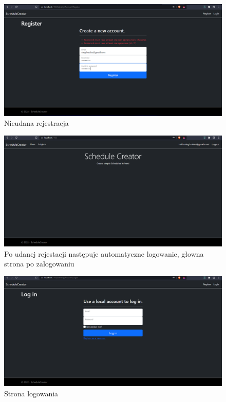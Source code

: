 \documentclass[a4paper,12pt,oneside]{book} %
\begin{document}
\begin{figure}[h]
    \centering\includegraphics[width=14cm]{3.png}
    \caption{Nieudana rejestracja}
\end{figure}

\begin{figure}[h]
    \centering\includegraphics[width=14cm]{4.png}
    \caption{Po udanej rejestacji następuje automatyczne logowanie, głowna strona po zalogowaniu}
\end{figure}

\begin{figure}[h]
    \centering\includegraphics[width=14cm]{5.png}
    \caption{Strona logowania}
\end{figure}
\end{document}
